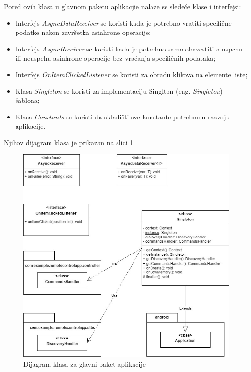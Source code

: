 \documentclass[implementacija.tex]{subfiles}
\begin{document}
Pored ovih klasa u glavnom paketu aplikacjie nalaze se sledeće klase i interfejsi:
\begin{itemize}
\item Interfejs \textit{AsyncDataReceiver} se koristi kada je potrebno vratiti specifične podatke nakon završetka asinhrone operacije;
\item Interfejs \textit{AsyncReceiver} se koristi kada je potrebno samo obavestiti o uspehu ili neuspehu asinhrone operacije bez vraćanja specifičnih podataka;
\item Interfejs \textit{OnItemClickedListener} se koristi za obradu klikova na elemente liste;
\item Klasa \textit{Singleton} se koristi za implementaciju Singlton (eng. \textit{Singleton}) šablona;
\item Klasa \textit{Constants} se koristi da skladišti sve konstante potrebne u razvoju aplikacije.
\end{itemize}
Njihov dijagram klasa je prikazan na slici \ref{fig:dijagramRoot}.

\begin{figure}[!ht]
  \centering
  \includegraphics[width=\textwidth]{Implementacija/dijagrami/app_root_package.jpg}
  \caption{Dijagram klasa za glavni paket aplikacije}
  \label{fig:dijagramRoot}
\end{figure}
\end{document}

